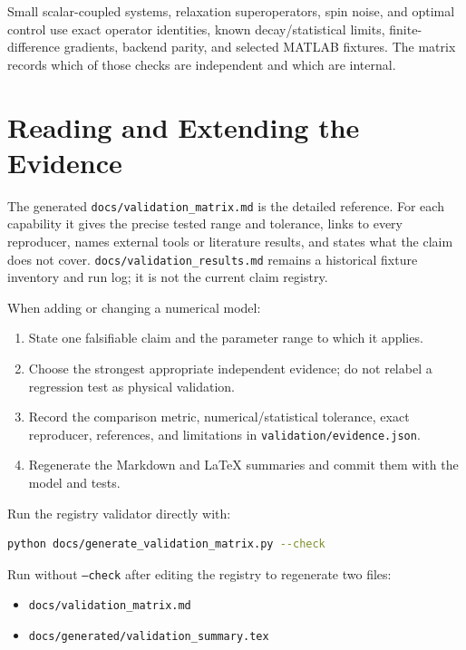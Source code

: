 \documentclass[11pt,oneside]{report}
\newcommand{\code}[1]{\texttt{#1}}
\begin{document}
Small scalar-coupled systems, relaxation superoperators, spin noise, and optimal
control use exact operator identities, known decay/statistical limits,
finite-difference gradients, backend parity, and selected MATLAB fixtures. The
matrix records which of those checks are independent and which are internal.



\section{Reading and Extending the Evidence}

The generated \code{docs/validation\_matrix.md} is the detailed reference. For
each capability it gives the precise tested range and tolerance, links to every
reproducer, names external tools or literature results, and states what the
claim does not cover. \code{docs/validation\_results.md} remains a historical
fixture inventory and run log; it is not the current claim registry.

When adding or changing a numerical model:

\begin{enumerate}
  \item State one falsifiable claim and the parameter range to which it applies.
  \item Choose the strongest appropriate independent evidence; do not relabel a
  regression test as physical validation.
  \item Record the comparison metric, numerical/statistical tolerance, exact
  reproducer, references, and limitations in \code{validation/evidence.json}.
  \item Regenerate the Markdown and LaTeX summaries and commit them with the
  model and tests.
\end{enumerate}

Run the registry validator directly with:

\begin{lstlisting}[language=bash]
python docs/generate_validation_matrix.py --check
\end{lstlisting}

Run without \code{--check} after editing the registry to regenerate two files:

\begin{itemize}
  \item \code{docs/validation\_matrix.md}
  \item \code{docs/generated/}\code{validation\_summary.tex}
\end{itemize}
\end{document}

